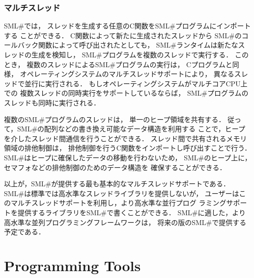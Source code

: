 \documentclass{jbook}
\newcommand{\txt}[2]{#2}
\newcommand{\smlsharp}{SML\#}
\begin{document}
\section{マルチスレッド}

	\smlsharp{}では，
スレッドを生成する任意のC関数を\smlsharp{}プログラムにインポートする
ことができる．
	C関数によって新たに生成されたスレッドから
\smlsharp{}のコールバック関数によって呼び出されたとしても，
\smlsharp{}ランタイムは新たなスレッドの生成を検知し，
\smlsharp{}プログラムを複数のスレッドで実行する．
	このとき，
複数のスレッドによる\smlsharp{}プログラムの実行は，
Cプログラムと同様，
オペレーティングシステムのマルチスレッドサポートにより，
異なるスレッドで並行に実行される．
	もしオペレーティングシステムがマルチコアCPU上での
複数スレッドの同時実行をサポートしているならば，
\smlsharp{}プログラムのスレッドも同時に実行される．

	複数の\smlsharp{}プログラムのスレッドは，
単一のヒープ領域を共有する．
	従って，\smlsharp{}の配列などの書き換え可能なデータ構造を利用する
ことで，ヒープを介したスレッド間通信を行うことができる．
	スレッド間で共有されるメモリ領域の排他制御は，
排他制御を行うC関数をインポートし呼び出すことで行う．
	\smlsharp{}はヒープに確保したデータの移動を行わないため，
\smlsharp{}のヒープ上に，セマフォなどの排他制御のためのデータ構造を
確保することができる．

	以上が，\smlsharp{}が提供する最も基本的なマルチスレッドサポートである．
	\smlsharp{}は標準では高水準なスレッドライブラリを提供しないが，
ユーザーはこのマルチスレッドサポートを利用し，より高水準な並行プログ
ラミングサポートを提供するライブラリを\smlsharp{}で書くことができる．
	\smlsharp{}に適した，より高水準な並列プログラミングフレームワークは，
将来の版の\smlsharp{}で提供する予定である．


% 
\part{\txt{プログラミングツール}{Programming Tools}}
\label{part:tools}
\end{document}
